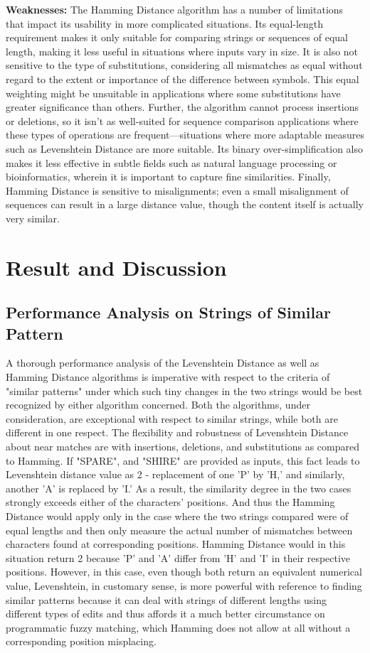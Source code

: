 \documentclass[conference]{IEEEtran}
\begin{document}
\textbf{Weaknesses:} The Hamming Distance algorithm has a number of limitations that impact its usability in more complicated situations. Its equal-length requirement makes it only suitable for comparing strings or sequences of equal length, making it less useful in situations where inputs vary in size. It is also not sensitive to the type of substitutions, considering all mismatches as equal without regard to the extent or importance of the difference between symbols. This equal weighting might be unsuitable in applications where some substitutions have greater significance than others. Further, the algorithm cannot process insertions or deletions, so it isn't as well-suited for sequence comparison applications where these types of operations are frequent—situations where more adaptable measures such as Levenshtein Distance are more suitable. Its binary over-simplification also makes it less effective in subtle fields such as natural language processing or bioinformatics, wherein it is important to capture fine similarities. Finally, Hamming Distance is sensitive to misalignments; even a small misalignment of sequences can result in a large distance value, though the content itself is actually very similar.

\section{Result and Discussion}

\subsection{Performance Analysis on Strings of Similar Pattern}
A thorough performance analysis of the Levenshtein Distance as well as Hamming Distance algorithms is imperative with respect to the criteria of "similar patterns" under which such tiny changes in the two strings would be best recognized by either algorithm concerned. Both the algorithms, under consideration, are exceptional with respect to similar strings, while both are different in one respect. The flexibility and robustness of Levenshtein Distance about near matches are with insertions, deletions, and substitutions as compared to Hamming. If "SPARE", and "SHIRE" are provided as inputs, this fact leads to Levenshtein distance value as 2 - replacement of one 'P' by 'H,' and similarly, another 'A' is replaced by 'I.' As a result, the similarity degree in the two cases strongly exceeds either of the characters' positions. And thus the Hamming Distance would apply only in the case where the two strings compared were of equal lengths and then only measure the actual number of mismatches between characters found at corresponding positions. Hamming Distance would in this situation return 2 because 'P' and 'A' differ from 'H' and 'I' in their respective positions. However, in this case, even though both return an equivalent numerical value, Levenshtein, in customary sense, is more powerful with reference to finding similar patterns because it can deal with strings of different lengths using different types of edits and thus affords it a much better circumstance on programmatic fuzzy matching, which Hamming does not allow at all without a corresponding position misplacing.
\end{document}
